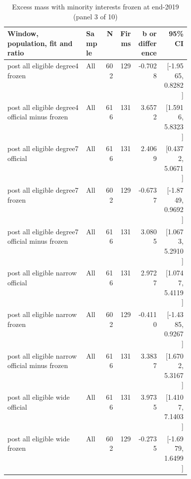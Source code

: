 \begin{table}[!htbp]\centering\scriptsize
\caption{Excess mass with minority interests frozen at end-2019 (panel 3 of 10)}
\begin{threeparttable}
\begin{tabular}{p{0.43\linewidth}lrrrr}
\toprule
Window, population, fit and ratio & Sample & N & Firms & b or difference & 95\% CI \\
\midrule
post all eligible degree4 frozen & All & 602 & 129 & -0.7028 & [-1.9565, 0.8282] \\
post all eligible degree4 official minus frozen & All & 616 & 131 & 3.6572 & [1.5916, 5.8323] \\
post all eligible degree7 official & All & 616 & 131 & 2.4069 & [0.4372, 5.0671] \\
post all eligible degree7 frozen & All & 602 & 129 & -0.6737 & [-1.8749, 0.9692] \\
post all eligible degree7 official minus frozen & All & 616 & 131 & 3.0805 & [1.0673, 5.2910] \\
post all eligible narrow official & All & 616 & 131 & 2.9727 & [1.0747, 5.4119] \\
post all eligible narrow frozen & All & 602 & 129 & -0.4110 & [-1.4385, 0.9267] \\
post all eligible narrow official minus frozen & All & 616 & 131 & 3.3837 & [1.6702, 5.3167] \\
post all eligible wide official & All & 616 & 131 & 3.9735 & [1.4107, 7.1403] \\
post all eligible wide frozen & All & 602 & 129 & -0.2735 & [-1.6979, 1.6499] \\
\bottomrule
\end{tabular}
\begin{tablenotes}[flushleft]\footnotesize

\end{tablenotes}
\end{threeparttable}
\end{table}

